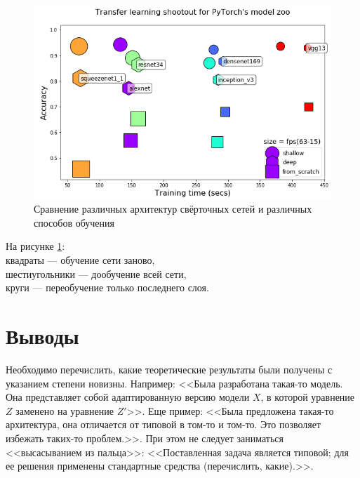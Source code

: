 \begin{figure}[h]
	\centering
	\includegraphics[width=0.7\linewidth]{img/comp}
	\caption{Сравнение различных архитектур свёрточных сетей и различных способов обучения}
	\label{fig:comp}
\end{figure}
На рисунке \ref{fig:comp}:\\
квадраты --- обучение сети заново,\\
шестиугольники --- дообучение всей сети,\\
круги --- переобучение только последнего слоя.




\section{Выводы}

Необходимо перечислить, какие теоретические результаты были получены с 
указанием степени новизны. Например: <<Была разработана такая-то модель. Она 
представляет собой адаптированную версию модели $X$, в которой уравнение $Z$ 
заменено на уравнение $Z'$>>. Еще пример: <<Была предложена такая-то 
архитектура, она отличается от типовой в том-то и том-то. Это позволяет 
избежать таких-то проблем.>>. При этом не следует заниматься <<высасыванием из 
пальца>>: <<Поставленная задача является типовой; для ее решения применены 
стандартные средства (перечислить, какие).>>.
